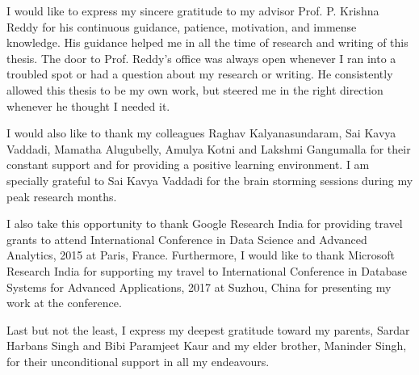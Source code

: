 I would like to express my sincere gratitude to my advisor Prof. P. Krishna Reddy for his continuous guidance, patience, motivation, and immense knowledge. His guidance helped me in all the time of research and writing of this thesis. The door to Prof. Reddy's office was always open whenever I ran into a troubled spot or had a question about my research or writing. He consistently allowed this thesis to be my own work, but steered me in the right direction whenever he thought I needed it.

I would also like to thank my colleagues Raghav Kalyanasundaram, Sai Kavya Vaddadi, Mamatha Alugubelly, Amulya Kotni and Lakshmi Gangumalla for their constant support and for providing a positive learning environment. I am specially grateful to Sai Kavya Vaddadi for the brain storming sessions during my peak research months.

I also take this opportunity to thank Google Research India for providing travel grants to attend International Conference in Data Science and Advanced Analytics, 2015 at Paris, France. Furthermore, I would like to thank Microsoft Research India for supporting my travel to International Conference in Database Systems for Advanced Applications, 2017 at Suzhou, China for presenting my work at the conference.

Last but not the least, I express my deepest gratitude toward my parents, Sardar Harbans Singh and Bibi Paramjeet Kaur and my elder brother, Maninder Singh, for their unconditional support in all my endeavours. 
  